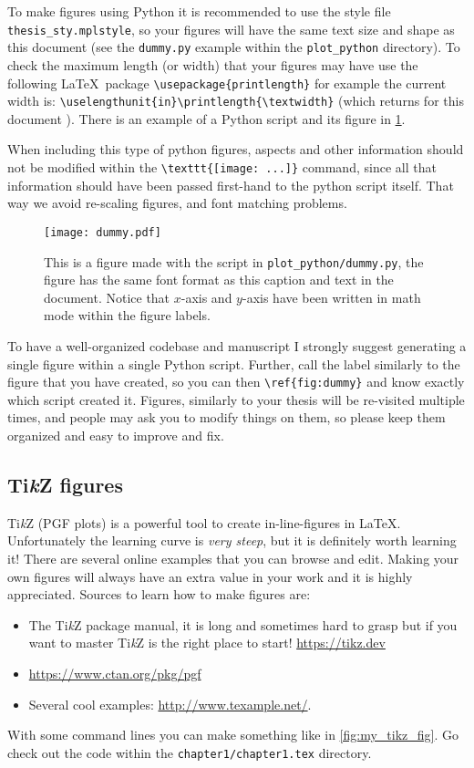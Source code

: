 To make figures using Python it is recommended to use the style file \texttt{thesis\_sty.mplstyle}, so your figures will have the same text size and shape as this document (see the \texttt{dummy.py} example within the \texttt{plot\_python} directory).
To check the maximum length (or width) that your figures may have use the following \LaTeX~package \verb|\usepackage{printlength}| for example the current width is: \verb|\uselengthunit{in}\printlength{\textwidth}| (which returns for this document \printlength{\textwidth}). There is an example of a Python script and its figure in \cref{fig:dummy}.

When including this type of python figures, aspects and other information should not be modified within the \verb|\texttt{[image: ...]}| command, since all that information should have been passed first-hand to the python script itself. That way we avoid re-scaling figures, and font matching problems.

\begin{figure}[t]
  \centering
  \texttt{[image: dummy.pdf]}
  \caption[My first Python figure]{This is a figure made with the script in \texttt{plot\_python/dummy.py}, the figure has the same font format as this caption and text in the document. Notice that $x$-axis and $y$-axis have been written in math mode within the figure labels.}
  \label{fig:dummy}
\end{figure}

To have a well-organized codebase and manuscript I strongly suggest generating a single figure within a single Python script. Further, call the label similarly to the figure that you have created, so you can then \verb|\ref{fig:dummy}| and know exactly which script created it. Figures, similarly to your thesis will be re-visited multiple times, and people may ask you to modify things on them, so please keep them organized and easy to improve and fix.

\subsection{Ti\textit{k}Z figures}
\label{sec:tikz}

Ti\textit{k}Z  (PGF plots) is a powerful tool to create in-line-figures in \LaTeX. Unfortunately the learning curve is \textit{very steep}, but it is definitely worth learning it! There are several online examples that you can browse and edit. Making your own figures will always have an extra value in your work and it is highly appreciated. Sources to learn how to make figures are:
\begin{itemize}
    \item The Ti\textit{k}Z package manual, it is long and sometimes hard to grasp but if you want to master Ti\textit{k}Z is the right place to start! \url{https://tikz.dev}
    \item \url{https://www.ctan.org/pkg/pgf}
    \item Several cool examples: \url{http://www.texample.net/}.
\end{itemize}
With some command lines you can make something like in \cref{fig:my_tikz_fig}. Go check out the code within the \texttt{chapter1/chapter1.tex} directory.


